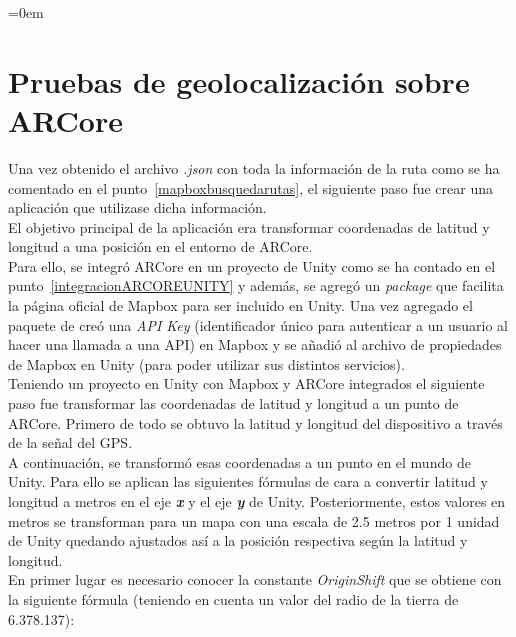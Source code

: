 \parindent=0em
\section{Pruebas de geolocalización sobre ARCore}
\label{pruebas geo arcore}
\noindent

Una vez obtenido el archivo \textit{.json} con toda la información de la ruta como se ha comentado en el punto~\ref{mapboxbusquedarutas}, el siguiente paso fue crear una aplicación que utilizase dicha información.\\

El objetivo principal de la aplicación era transformar coordenadas de latitud y longitud a una posición en el entorno de ARCore.\\

Para ello, se integró ARCore en un proyecto de Unity como se ha contado en el punto~\ref{integracionARCOREUNITY} y además, se agregó un \textit{package} que facilita la página oficial de Mapbox para ser incluido en Unity. Una vez agregado el paquete de creó una \textit{API Key} (identificador único para autenticar a un usuario al hacer una llamada a una API) en Mapbox y se añadió al archivo de propiedades de Mapbox en Unity (para poder utilizar sus distintos servicios).\\

Teniendo un proyecto en Unity con Mapbox y ARCore integrados el siguiente paso fue transformar las coordenadas de latitud y longitud a un punto de ARCore. Primero de todo se obtuvo la latitud y longitud del dispositivo a través de la señal del GPS.\\

A continuación, se transformó esas coordenadas a un punto en el mundo de Unity. Para ello se aplican las siguientes fórmulas de cara a convertir latitud y longitud a metros en el eje \textbf{\textit{x}} y el eje \textbf{\textit{y}} de Unity. Posteriormente, estos valores en metros se transforman para un mapa con una escala de 2.5 metros por 1 unidad de Unity quedando ajustados así a la posición respectiva según la latitud y longitud.\\



En primer lugar es necesario conocer la constante \textit{OriginShift} que se obtiene con la siguiente fórmula (teniendo en cuenta un valor del radio de la tierra de 6.378.137):\\


